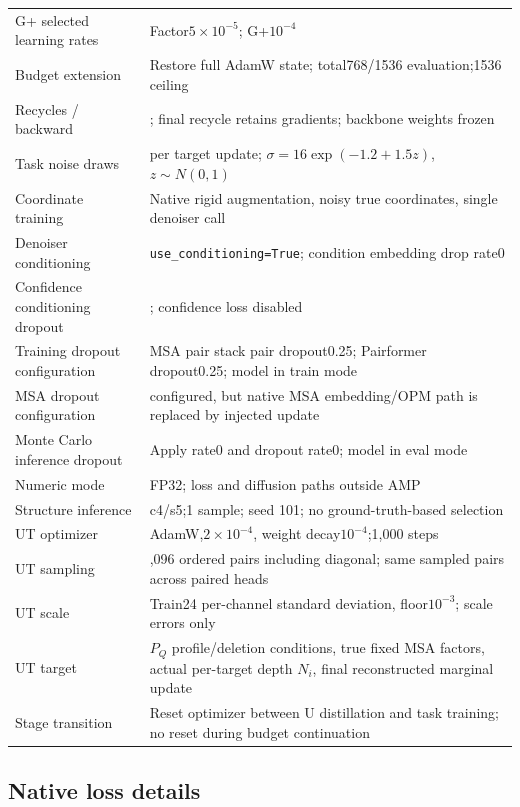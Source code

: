 \begin{longtable}[]{@{}
  >{\raggedright\arraybackslash}p{}
  >{\raggedright\arraybackslash}p{}@{}}
G+ selected learning rates & Factor\(5\times10^{-5}\); G+\(10^{-4}\) \\
Budget extension & Restore full AdamW state; total768/1536 evaluation;1536 ceiling \\
Recycles / backward & 4; final recycle retains gradients; backbone weights frozen \\
Task noise draws & 1 per target update; \(\sigma=16\exp(-1.2+1.5z)\), \(z\sim N(0,1)\) \\
Coordinate training & Native rigid augmentation, noisy true coordinates, single denoiser call \\
Denoiser conditioning & \nolinkurl{use_conditioning=True}; condition embedding drop rate0 \\
Confidence conditioning dropout & 0; confidence loss disabled \\
Training dropout configuration & MSA pair stack pair dropout0.25; Pairformer dropout0.25; model in train mode \\
MSA dropout configuration & 0.15 configured, but native MSA embedding/OPM path is replaced by injected update \\
Monte Carlo inference dropout & Apply rate0 and dropout rate0; model in eval mode \\
Numeric mode & FP32; loss and diffusion paths outside AMP \\
Structure inference & c4/s5;1 sample; seed 101; no ground-truth-based selection \\
UT optimizer & AdamW,\(2\times10^{-4}\), weight decay\(10^{-4}\);1,000 steps \\
UT sampling & 4,096 ordered pairs including diagonal; same sampled pairs across paired heads \\
UT scale & Train24 per-channel standard deviation, floor\(10^{-3}\); scale errors only \\
UT target & \(P_Q\) profile/deletion conditions, true fixed MSA factors, actual per-target depth \(N_i\), final reconstructed marginal update \\
Stage transition & Reset optimizer between U distillation and task training; no reset during budget continuation \\
\end{longtable}

\subsection{Native loss details}\label{native-loss-details}

